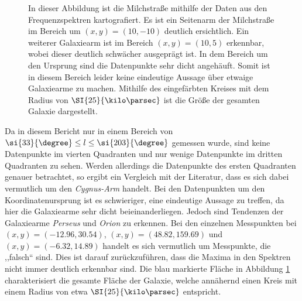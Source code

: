 \begin{figure}[H]
    \centering
       
    \caption[Abbildung der Milchstraße]{In dieser Abbildung ist die Milchstraße mithilfe der Daten aus den Frequenzspektren kartografiert.
    Es ist ein Seitenarm der Milchstraße im Bereich um $(x,y)=(10,-10)$ deutlich ersichtlich.
    Ein weiterer Galaxiearm ist im Bereich $(x,y)=(10,5)$ erkennbar, wobei dieser deutlich schwächer ausgeprägt ist.
    In dem Bereich um den Ursprung sind die Datenpunkte sehr dicht angehäuft. 
    Somit ist in diesem Bereich leider keine eindeutige Aussage über etwaige Galaxiearme zu machen. 
    Mithilfe des eingefärbten Kreises mit dem Radius von $\SI{25}{\kilo \parsec}$ ist die Größe der gesamten Galaxie dargestellt.}
    \label{fig:Milchstrassesafe}
\end{figure}
\newpage
Da in diesem Bericht nur in einem Bereich von $\si{33}{\degree} \le l \le \si{203}{\degree}$ gemessen wurde, sind keine Datenpunkte im vierten Quadranten und nur wenige Datenpunkte im dritten Quadranten zu sehen.
Werden allerdings die Datenpunkte des ersten Quadranten genauer betrachtet, so ergibt ein Vergleich mit der Literatur, dass es sich dabei vermutlich um den \textit{Cygnus-Arm} handelt. 
Bei den Datenpunkten um den Koordinatenursprung ist es schwieriger, eine eindeutige Aussage zu treffen, da hier die Galaxiearme sehr dicht beieinanderliegen. 
Jedoch sind Tendenzen der Galaxiearme \textit{Perseus} und \textit{Orion} zu erkennen. Bei den einzelnen Messpunkten bei $(x,y)=(-12.96, 30.54)$, $(x,y)=(48.82, 159.69)$ und $(x,y)=(-6.32, 14.89)$ handelt es sich vermutlich um Messpunkte, die ,,falsch`` sind. 
Dies ist darauf zurückzuführen, dass die Maxima in den Spektren nicht immer deutlich erkennbar sind. Die blau markierte Fläche in Abbildung \ref{fig:Milchstrassesafe} charakterisiert die gesamte Fläche der Galaxie, welche annähernd einen Kreis mit einem Radius von etwa $\SI{25}{\kilo \parsec}$ entspricht.

